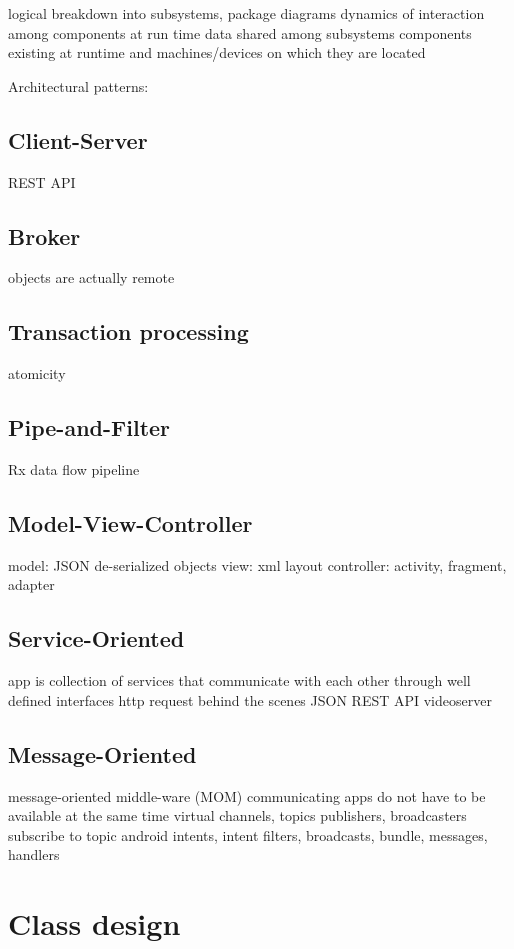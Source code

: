 logical breakdown into subsystems, package diagrams
dynamics of interaction among components at run time
data shared among subsystems
components existing at runtime and machines/devices on which they are located

Architectural patterns:

\subsection{Client-Server}
REST API

\subsection{Broker}
objects are actually remote

\subsection{Transaction processing}
atomicity

\subsection{Pipe-and-Filter}
Rx data flow pipeline

\subsection{Model-View-Controller}
model: JSON de-serialized objects
view: xml layout
controller: activity, fragment, adapter

\subsection{Service-Oriented}
app is collection of services that communicate with each other through well defined interfaces
http request behind the scenes
JSON REST API
videoserver

\subsection{Message-Oriented}
message-oriented middle-ware (MOM)
communicating apps do not have to be available at the same time
virtual channels, topics
publishers, broadcasters
subscribe to topic
android intents, intent filters, broadcasts, bundle, messages, handlers

\section{Class design}


